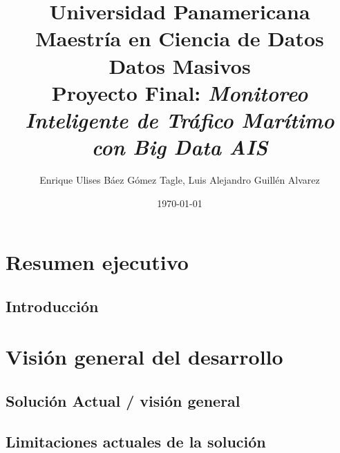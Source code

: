 \documentclass[10pt]{article}
\title{Universidad Panamericana \\ Maestría en Ciencia de Datos \\ Datos Masivos \\ 
    \vspace{0.5cm} Proyecto Final: \textit{Monitoreo Inteligente de Tráfico Marítimo con Big Data AIS}}
\author{Enrique Ulises Báez Gómez Tagle, Luis Alejandro Guillén Alvarez}
\date{\today}
\begin{document}
\maketitle

\tableofcontents

\newpage

\section{Resumen ejecutivo}
\subsection{Introducción}
\section{Visión general del desarrollo}
\subsection{Solución Actual / visión general}
\subsection{Limitaciones actuales de la solución}
\end{document}
